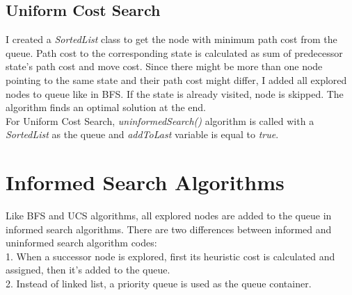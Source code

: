 \documentclass[12pt]{article}
\begin{document}
\subsection{Uniform Cost Search}
I created a \textit{SortedList} class to get the node with minimum path cost from the queue. Path cost to the corresponding state is calculated as sum of predecessor state's path cost and move cost. Since there might be more than one node pointing to the same state and their path cost might differ, I added all explored nodes to queue like in BFS. If the state is already visited, node is skipped. The algorithm finds an optimal solution at the end.\\
For Uniform Cost Search, \textit{uninformedSearch()} algorithm is called with a \textit{SortedList} as the queue and \textit{addToLast} variable is equal to \textit{true}.

\section{Informed Search Algorithms}

Like BFS and UCS algorithms, all explored nodes are added to the queue in informed search algorithms. There are two differences between informed and uninformed search algorithm codes:\\
1. When a successor node is explored, first its heuristic cost is calculated and assigned, then it's added to the queue.\\
2. Instead of linked list, a priority queue is used as the queue container.\\
\end{document}

